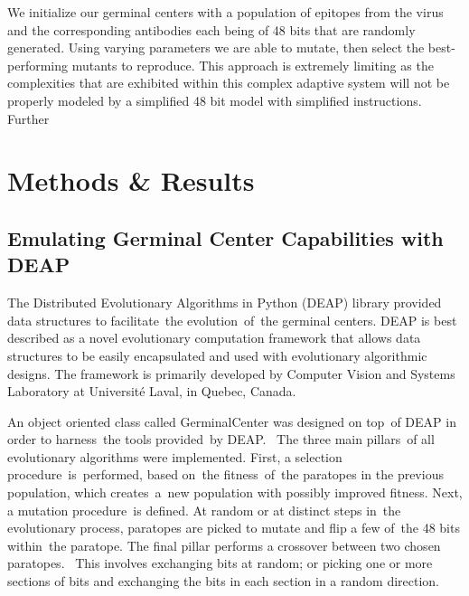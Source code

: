 \documentclass[conference]{IEEEtran}
\begin{document}
We initialize our germinal centers with a population of epitopes from the virus and the corresponding antibodies each being of 48 bits that are randomly generated. Using varying parameters we are able to mutate, then select the best-performing mutants to reproduce. This approach is extremely limiting as the complexities that are exhibited within this complex adaptive system will not be properly modeled by a simplified 48 bit model with simplified instructions. Further

\section{Methods \& Results}


\subsection{Emulating Germinal Center Capabilities with DEAP}

The Distributed Evolutionary Algorithms in Python (DEAP) library provided data structures to facilitate the evolution of the germinal centers. DEAP is best described as a novel evolutionary computation framework that allows data structures to be easily encapsulated and used with evolutionary algorithmic designs. The framework is primarily developed by Computer Vision and Systems Laboratory at Université Laval, in Quebec, Canada.

An object oriented class called GerminalCenter was designed on top of DEAP in order to harness the tools provided by DEAP.  The three main pillars of all evolutionary algorithms were implemented. First, a selection procedure is performed, based on the fitness of the paratopes in the previous population, which creates a new population with possibly improved fitness. Next, a mutation procedure is defined. At random or at distinct steps in the evolutionary process, paratopes are picked to mutate and flip a few of the 48 bits within the paratope. The final pillar performs a crossover between two chosen paratopes.  This involves exchanging bits at random; or picking one or more sections of bits and exchanging the bits in each section in a random direction. 
\end{document}
